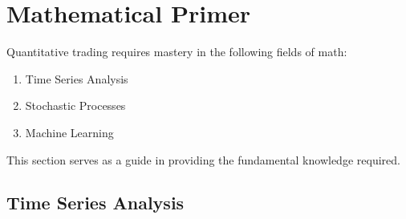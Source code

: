 \section{Mathematical Primer}

Quantitative trading requires mastery in the following fields of math:
\begin{enumerate}[label=\roman*.]
\setlength{\itemsep}{0pt}
\item Time Series Analysis
\item Stochastic Processes
\item Machine Learning
\end{enumerate}

This section serves as a guide in providing the fundamental knowledge required.

\subsection{Time Series Analysis}




